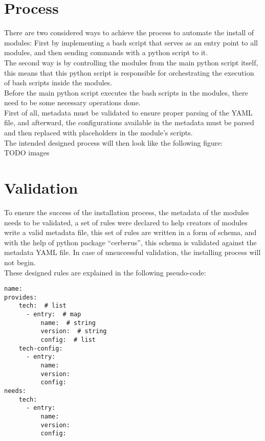 \section{Process}
There are two considered ways to achieve the process to automate the install of modules:
First by implementing a bash script that serves as an entry point to all modules, and then sending commands with a python script to it.\\
The second way is by controlling the modules from the main python script itself, this means that this python script is responsible for orchestrating the execution of bash scripts inside the modules.\\
Before the main python script executes the bash scripts in the modules, there need to be some necessary operations done.\\
First of all, metadata must be validated to ensure proper parsing of the YAML file, and afterward, the configurations available in the metadata must be parsed and then replaced with placeholders in the module’s scripts.\\
The intended designed process will then look like the following figure:\\
TODO images

\section{Validation}
To ensure the success of the installation process, the metadata of the modules needs to be validated, a set of rules were declared to help creators of modules write a valid metadata file, this set of rules are written in a form of schema, and with the help of python package “cerberus”\cite{cerberus}, this schema is validated against the metadata YAML file. In case of unsuccessful validation, the installing process will not begin.\\
These designed rules are explained in the following pseudo-code:\\

\begin{lstlisting}[caption=YAML Schema, style=pythonstyle]
name:
provides:
    tech:  # list
      - entry:  # map
          name:  # string
          version:  # string
          config:  # list
    tech-config:
      - entry:
          name:
          version:
          config:
needs:
    tech:
      - entry:
          name:
          version:
          config:
\end{lstlisting}

